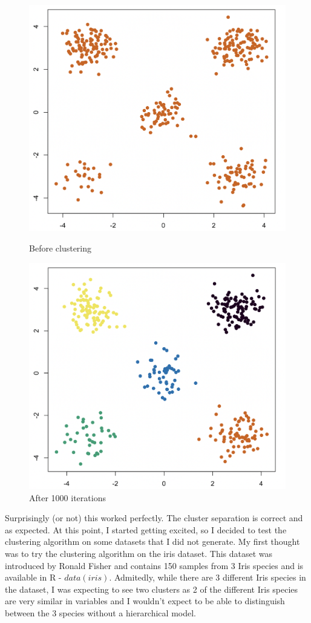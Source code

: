 \documentclass[12pt,a4paper]{article}
\begin{document}
\begin{figure} [H]
    \centering
    \begin{minipage}{.5\textwidth}
      \centering
      \includegraphics[width=0.8\linewidth]{initial_split_data.png}
      \caption{Before clustering}
      \label{fig:before clustering}
    \end{minipage}%
    \begin{minipage}{.5\textwidth}
      \centering
      \includegraphics[width=0.8\linewidth]{split_data_clustered}
      \caption{After 1000 iterations}
      \label{fig:split points after clustering}
    \end{minipage}
\end{figure}
    
Surprisingly (or not) this worked perfectly. The cluster separation is correct and as expected. At this point, I started getting excited, so I decided to test the clustering algorithm on some datasets that I did not generate. My first thought was to try the clustering algorithm on the iris dataset. This dataset was introduced by Ronald Fisher and contains 150 samples from 3 Iris species and is available in R - $data(iris)$. Admitedly, while there are 3 different Iris species in the dataset, I was expecting to see two clusters as 2 of the different Iris species are very similar in variables and I wouldn't expect to be able to distinguish between the 3 species without a hierarchical model.
\end{document}
